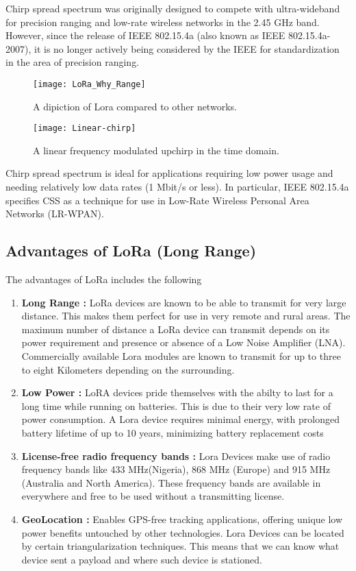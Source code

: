 Chirp spread spectrum was originally designed to compete with ultra-wideband for precision ranging and low-rate wireless networks in the 2.45 GHz band. However, since the release of IEEE 802.15.4a (also known as IEEE 802.15.4a-2007), it is no longer actively being considered by the IEEE for standardization in the area of precision ranging.

\begin{figure}[p]
\texttt{[image: LoRa\_Why\_Range]}
\centering
\caption{A dipiction of Lora compared to other networks.}
\centering
\label{fig:lo1}


\end{figure}

\begin{figure}[p]

\texttt{[image: Linear-chirp]}
\centering
\caption{A linear frequency modulated upchirp in the time domain.}
\centering
\label{fig:css}
\end{figure}

Chirp spread spectrum is ideal for applications requiring low power usage and needing relatively low data rates (1 Mbit/s or less). In particular, IEEE 802.15.4a specifies CSS as a technique for use in Low-Rate Wireless Personal Area Networks (LR-WPAN).

\subsection{Advantages of LoRa (Long Range)}
The advantages of LoRa includes the following
\begin{enumerate}
\item \textbf{Long Range :} LoRa devices are known to be able to transmit for very large distance. This makes them perfect for use in very remote and rural areas. The maximum number of distance a LoRa device can transmit depends on its power requirement and presence or absence of a Low Noise Amplifier (LNA). Commercially available Lora modules are known to transmit for up to three to eight Kilometers depending on the surrounding. 
\item \textbf{Low Power :} LoRA devices pride themselves with the abilty to last for a long time while running on batteries. This is due to their very low rate of power consumption. A Lora device requires minimal energy, with prolonged battery lifetime of up to 10 years, minimizing battery replacement costs
\item \textbf{License-free radio frequency bands :}  Lora Devices make use of radio frequency bands like 433 MHz(Nigeria), 868 MHz (Europe) and 915 MHz (Australia and North America). These frequency bands are available in everywhere and free to be used without a transmitting license. 
\item \textbf{GeoLocation :}  Enables GPS-free tracking applications, offering unique low power benefits untouched by other technologies. Lora Devices can be located by certain triangularization techniques. This means that we can know what device sent a payload and where such device is stationed. 
\end{enumerate}

